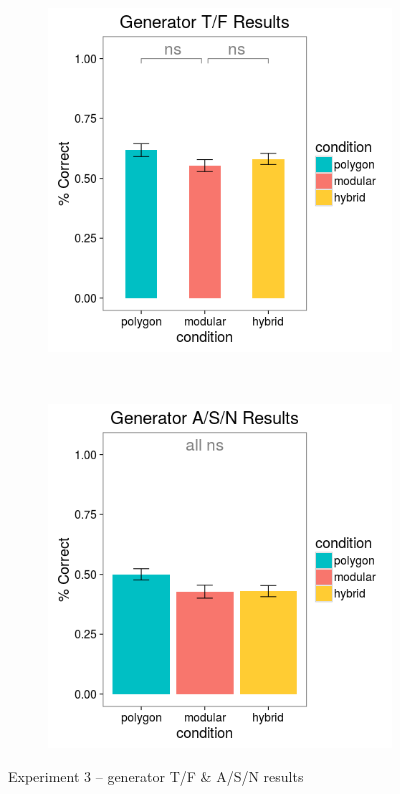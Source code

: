 \documentclass[man,10pt]{apa6}
\begin{document}
\begin{figure}[H]
\centering
\begin{subfigure}[c]{0.3\textwidth}
\centering
\includegraphics[width=\textwidth]{figures/3/gen_TF_r.png}
\end{subfigure}
~
\begin{subfigure}[c]{0.3\textwidth}
\centering
\includegraphics[width=\textwidth]{figures/3/gen_ASN_r.png}
\end{subfigure}
\caption{Experiment 3 -- generator T/F \& A/S/N results}
\label{ex3_TFASN}
\end{figure}\noindent 
\end{document}
